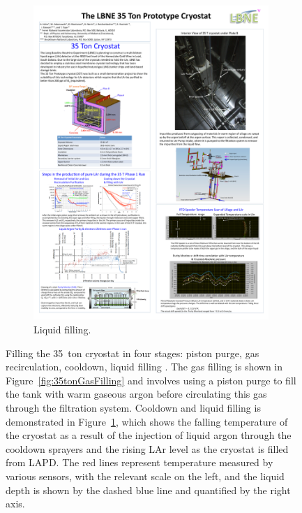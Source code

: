\begin{figure}
\begin{subfigure}[t]{0.48\linewidth}
    \includegraphics[width=0.98\textwidth]{35tonLiquidFilling.pdf}
    \caption{Liquid filling.}
    \label{fig:35tonLiquidFilling}
  \end{subfigure}
  \caption[Filling the 35~ton cryostat in four stages: piston purge, gas recirculation, cooldown and liquid filling.]{Filling the 35~ton cryostat in four stages: piston purge, gas recirculation, cooldown, liquid filling \cite{35tonPhaseI2015}.  The gas filling is shown in Figure~\ref{fig:35tonGasFilling} and involves using a piston purge to fill the tank with warm gaseous argon before circulating this gas through the filtration system.  Cooldown and liquid filling is demonstrated in Figure~\ref{fig:35tonLiquidFilling}, which shows the falling temperature of the cryostat as a result of the injection of liquid argon through the cooldown sprayers and the rising LAr level as the cryostat is filled from LAPD.  The red lines represent temperature measured by various sensors, with the relevant scale on the left, and the liquid depth is shown by the dashed blue line and quantified by the right axis.}
  \label{fig:35tonFilling}
\end{figure}

